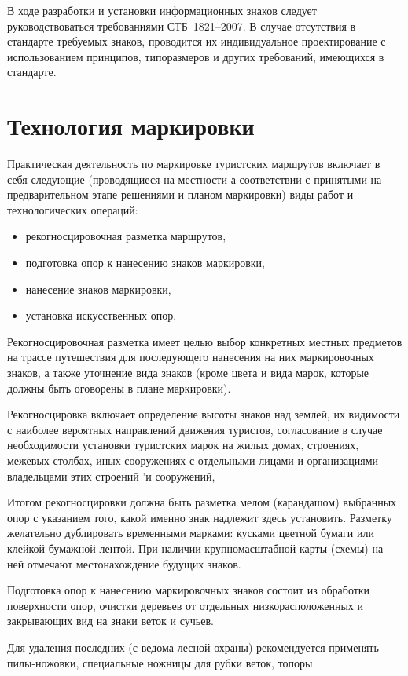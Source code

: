 \documentclass[a4paper,12pt]{extarticle}
\begin{document}
В ходе разработки и установки информационных знаков следует руководствоваться требованиями СТБ~1821--2007. В случае
отсутствия в стандарте требуемых знаков, проводится их индивидуальное проектирование с использованием принципов,
типоразмеров и других требований, имеющихся в стандарте.

\section{Технология маркировки}

Практическая деятельность по маркировке туристских маршрутов включает в себя следующие (проводящиеся на местности а
соответствии с принятыми на предварительном этапе решениями и планом маркировки) виды работ и технологических операций:

\begin{itemize}
	\item рекогносцировочная разметка маршрутов,
	\item подготовка опор к нанесению знаков маркировки,
	\item нанесение знаков маркировки,
	\item установка искусственных опор.
\end{itemize}

Рекогносцировочная разметка имеет целью выбор конкретных местных предметов на трассе путешествия для последующего
нанесения на них маркировочных знаков, а также уточнение вида знаков (кроме цвета и вида марок, которые должны быть
оговорены в плане маркировки).

Рекогносцировка включает определение высоты знаков над землей, их видимости с наиболее вероятных направлений движения
туристов, согласование в случае необходимости установки туристских марок на жилых домах, строениях, межевых столбах,
иных сооружениях с отдельными лицами и организациями --- владельцами этих строений 'и сооружений,

Итогом рекогносцировки должна быть разметка мелом (карандашом) выбранных опор с указанием того, какой именно знак
надлежит здесь установить. Разметку желательно дублировать временными марками: кусками цветной бумаги или клейкой
бумажной лентой. При наличии крупномасштабной карты (схемы) на ней отмечают местонахождение будущих знаков.

Подготовка опор к нанесению маркировочных знаков состоит из обработки поверхности опор, очистки деревьев от отдельных
низкорасположенных и закрывающих вид на знаки веток и сучьев.

Для удаления последних (с ведома лесной охраны) рекомендуется применять пилы-ножовки, специальные ножницы для рубки
веток, топоры.
\end{document}

